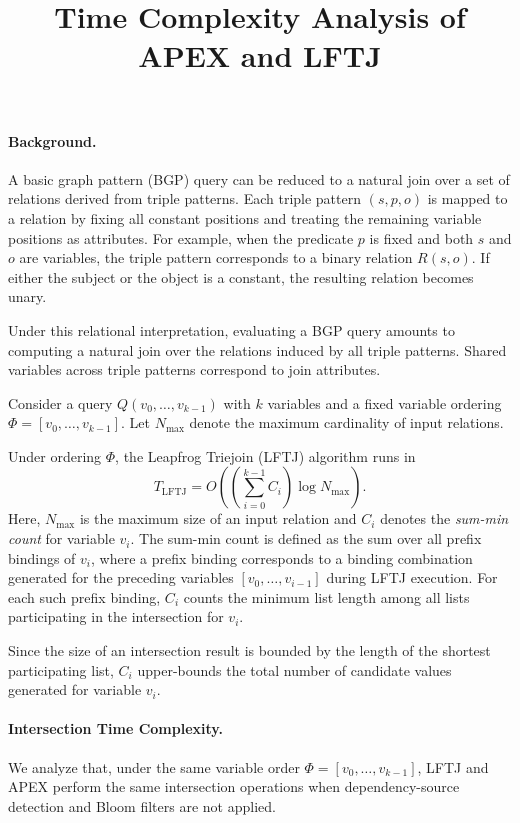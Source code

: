 \documentclass[11pt]{article}
\begin{document}
\title{Time Complexity Analysis of APEX and LFTJ}
\author{}
\date{}
\maketitle

\paragraph{\textbf{Background.}}
A basic graph pattern (BGP) query can be reduced to a natural join over a set of relations derived from triple patterns.
Each triple pattern $(s,p,o)$ is mapped to a relation by fixing all constant positions and treating the remaining variable positions as attributes.
For example, when the predicate $p$ is fixed and both $s$ and $o$ are variables, the triple pattern corresponds to a binary relation $R(s,o)$.
If either the subject or the object is a constant, the resulting relation becomes unary.

Under this relational interpretation, evaluating a BGP query amounts to computing a natural join over the relations induced by all triple patterns.
Shared variables across triple patterns correspond to join attributes.

Consider a query $Q(v_0,\dots,v_{k-1})$ with $k$ variables and a fixed variable ordering $\Phi = [v_0,\dots,v_{k-1}]$. 
Let $N_{\max}$ denote the maximum cardinality of input relations.

Under ordering $\Phi$, the Leapfrog Triejoin (LFTJ) algorithm runs in
$$
T_{\text{LFTJ}} = O\!\left(\left(\sum_{i=0}^{k-1} C_i\right)\log N_{\max}\right).
$$
Here, $N_{\max}$ is the maximum size of an input relation and $C_i$ denotes the \emph{sum-min count} for variable $v_i$. 
The sum-min count is defined as the sum over all prefix bindings of $v_i$, where a prefix binding corresponds to a binding combination generated for the preceding variables $[v_0, \ldots, v_{i-1}]$ during LFTJ execution.
For each such prefix binding, $C_i$ counts the minimum list length among all lists participating in the intersection for $v_i$.

Since the size of an intersection result is bounded by the length of the shortest participating list, $C_i$ upper-bounds the total number of candidate values generated for variable $v_i$.

\paragraph{\textbf{Intersection Time Complexity.}}
We analyze that, under the same variable order $\Phi=[v_0, \ldots, v_{k-1}]$, LFTJ and APEX perform the same intersection operations when dependency-source detection and Bloom filters are not applied.
\end{document}
